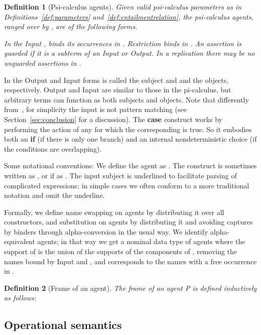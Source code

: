 \documentclass{eptcs}
\newtheorem{definition}{Definition}
\theoremstyle{definition}
\begin{document}
\begin{definition}[Psi-calculus agents]\label{def:agents}
Given valid psi-calculus parameters as in Definitions~\ref{def:parameters} and~\ref{def:entailmentrelation}, the psi-calculus {\em agents}, ranged over by ,  are of the following forms.
{\rm

}

\noindent
In the Input ,   binds its occurrences in . 
Restriction binds  in . An assertion is {\em guarded} if it is a subterm
of an Input or Output. In a replication  there may be no unguarded
assertions in .
\end{definition}
In the Output and Input forms  is called the subject and
 and  the objects, respectively.
Output and Input  are similar to those in the pi-calculus, but
arbitrary terms can function as both subjects and objects.
Note that differently from~\cite{bengtson.johansson.ea:psi-calculi},
for simplicity the input is not pattern matching (see
Section~\ref{sec:conclusion} for a discussion).
The {\bf case} construct works by performing the action of any
 for which the corresponding  is true. So it
embodies both an {\bf if} (if there is only one branch) and an internal
nondeterministic choice (if the conditions are overlapping).

Some notational conventions: We define the agent  as .
The  construct 
 is
sometimes written as
\mbox{\rm }, or if  as 
.
The input subject is underlined to facilitate parsing of complicated
expressions; in simple cases we often conform to a more traditional notation and
omit the underline.

Formally, we define name swapping on agents by distributing it over all constructors, and substitution on agents by distributing it and avoiding captures by binders through alpha-conversion in the usual way. We identify alpha-equivalent agents; in that way we get a nominal data type of agents where
the support  of  is the union of
the supports of the components of , removing the names bound by Input and
, and corresponds to the names with a free occurrence in .


\begin{definition}[Frame of an agent]
The {\em frame  of an agent} P is defined inductively as follows:

\end{definition}

\subsection{Operational semantics}
\end{document}
